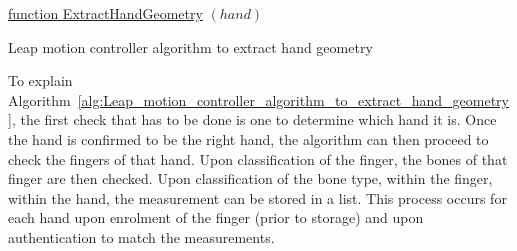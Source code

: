 \begin{algorithm}[H]

    \underline{function ExtractHandGeometry} $(hand)$\;
    \caption{Leap motion controller algorithm to extract hand geometry}     
    \label{alg:Leap_motion_controller_algorithm_to_extract_hand_geometry}
\end{algorithm}



To explain Algorithm~\ref{alg:Leap_motion_controller_algorithm_to_extract_hand_geometry}, the first check that has to be done is one to determine which hand it is. Once the hand is confirmed to be the right hand, the algorithm can then proceed to check the fingers of that hand. Upon classification of the finger, the bones of that finger are then checked. Upon classification of the bone type, within the finger, within the hand, the measurement can be stored in a list. This process occurs for each hand upon enrolment of the finger (prior to storage) and upon authentication to match the measurements.

